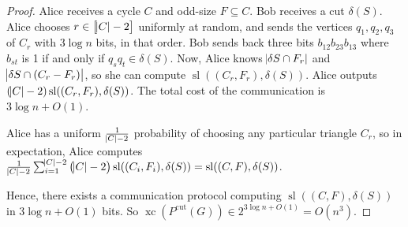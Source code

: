 \documentclass{article}
\DeclareMathOperator{\xc}{xc}
\DeclareMathOperator{\Sl}{sl}
\begin{document}
\begin{proof}
Alice receives a cycle $C$ and odd-size $F\subseteq C$. Bob receives
a cut $\delta(S)$. Alice chooses $r\in \sbr{\abs{C}-2}$ uniformly
at random, and sends the vertices $q_1,q_2,q_3$ of $C_r$ with $3\log n$ bits,
in that order.
Bob sends back three bits $b_{12}b_{23}b_{13}$ where $b_{st}$ is 1
if and only if $q_sq_t \in\delta(S)$.
Now, Alice knows $\abs{\delta{S}\cap F_r}$ and $\abs{\delta{S}\cap (C_r-F_r)}$,
so she can compute $\Sl((C_r, F_r),\delta(S))$. Alice outputs
$(\abs{C}-2)\Sl((C_r,F_r),\delta(S))$. The total cost
of the communication is $3\log n + O(1)$.

Alice has a uniform $\frac{1}{\abs{C}-2}$ probability of choosing
any particular triangle $C_r$, so in expectation, Alice computes
$\frac{1}{\abs{C}-2}\sum_{i=1}^{\abs{C}-2}\del{\abs{C}-2}\Sl((C_i,F_i),\delta(S)) = \Sl((C,F), \delta(S))$. 

Hence, there exists a communication protocol computing 
$\Sl((C,F), \delta(S))$ in $3\log n+O(1)$ bits. 
So $\xc(P^{\text{cut}}(G)) \in 2^{3\log n + O(1)} = O(n^3)$. 
\end{proof}
\end{document}
